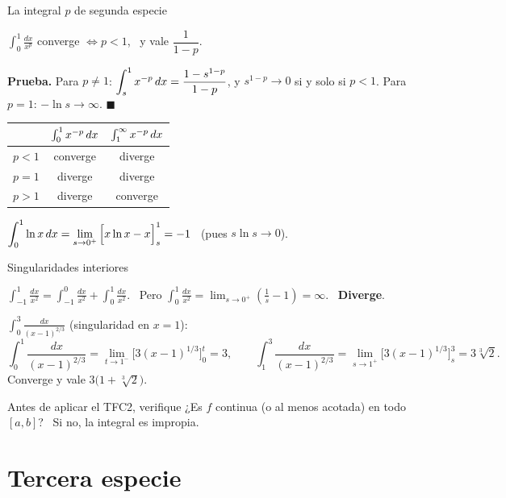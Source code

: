 \documentclass[10pt,aspectratio=169]{beamer}
\begin{document}
\begin{frame}{La integral $p$ de segunda especie}
  \begin{teorema}
    $\displaystyle\int_0^1\frac{dx}{x^p}$ converge $\iff p<1$, \ y vale $\dfrac1{1-p}$.
  \end{teorema}
  \textbf{Prueba.} Para $p\ne1$: $\displaystyle\int_s^1x^{-p}\,dx=\frac{1-s^{1-p}}{1-p}$, y $s^{1-p}\to0$ si y solo si $p<1$.
  Para $p=1$: $-\ln s\to\infty$. $\blacksquare$
  \begin{center}
    \renewcommand{\arraystretch}{1.4}
    \begin{tabular}{c|c|c}
      & $\int_0^1x^{-p}\,dx$ & $\int_1^\infty x^{-p}\,dx$\\ \hline
      $p<1$ & converge & diverge\\
      $p=1$ & diverge & diverge\\
      $p>1$ & diverge & converge
    \end{tabular}
  \end{center}
  \begin{ejemplo}[7]
    $\displaystyle\int_0^1\ln x\,dx=\lim_{s\to0^+}\Big[x\ln x-x\Big]_s^1=-1$ \ (pues $s\ln s\to0$).
  \end{ejemplo}
\end{frame}

\begin{frame}{Singularidades interiores}
  \begin{ejemplo}
    $\displaystyle\int_{-1}^1\frac{dx}{x^2}=\int_{-1}^0\frac{dx}{x^2}+\int_0^1\frac{dx}{x^2}$. \
    Pero $\displaystyle\int_0^1\frac{dx}{x^2}=\lim_{s\to0^+}\left(\frac1s-1\right)=\infty$. \ \textbf{Diverge}.
  \end{ejemplo}
  \begin{ejemplo}[9]
    $\displaystyle\int_0^3\frac{dx}{(x-1)^{2/3}}$ (singularidad en $x=1$):
    \[ \int_0^1\frac{dx}{(x-1)^{2/3}}=\lim_{t\to1^-}\Big[3(x-1)^{1/3}\Big]_0^t=3,\qquad
       \int_1^3\frac{dx}{(x-1)^{2/3}}=\lim_{s\to1^+}\Big[3(x-1)^{1/3}\Big]_s^3=3\sqrt[3]2. \]
    Converge y vale $3\big(1+\sqrt[3]2\big)$.
  \end{ejemplo}
  \begin{block}{Antes de aplicar el TFC2, verifique}
    ¿Es $f$ continua (o al menos acotada) en todo $[a,b]$? \ Si no, la integral es impropia.
  \end{block}
\end{frame}

\section{Tercera especie}
\end{document}
